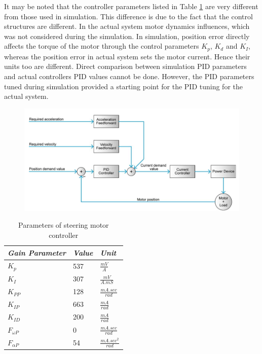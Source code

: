  It may be noted that the controller parameters listed in Table \ref{tb:steer} are very different from those used in simulation. This difference is due to the fact that the control structures are different. In the actual system motor dynamics influences, which was not considered during the simulation. In simulation,  position error directly affects the torque of the motor through the control parameters $K_p$, $K_d$ and $K_I$, whereas the position error in actual system sets  the motor current. Hence their units too are different. Direct comparison between simulation PID parameters and actual controllers PID values cannot be done. However, the PID parameters tuned during simulation provided a starting point for the PID tuning for the actual system.  
\begin{figure}
	\includegraphics[width=\linewidth,keepaspectratio]{Chapter5/fig/posLoop}
	\label{fig:posloop} 
\end{figure}
\begin{table}[!htbp]
	\caption{ Parameters of steering motor controller }
	\label{tb:steer}
	\centering
	\begin{tabular}{l l l}
		\hline
		\emph{Gain Parameter}  & \emph{ Value} & \emph{Unit} \\
		\hline
		$K_p$  & 537 &  $\frac{mV}{A}$ \\ 
		$K_I $ & 307 & $\frac{mV}{A.mS}$ \\
		$K_{PP}$& 128 & $ \frac{mA.sec}{rad}$\\
		$K_{IP}$&663&$\frac{mA}{rad}$\\
		$K_{ID}$&200&$\frac{mA}{rad}$\\
		$F_{\omega P}$& 0& $ \frac{mA.sec}{rad}$\\
		$F_{\alpha P}$& 54& $ \frac{mA.sec^2}{rad}$\\
		\hline
	\end{tabular}
\end{table}
